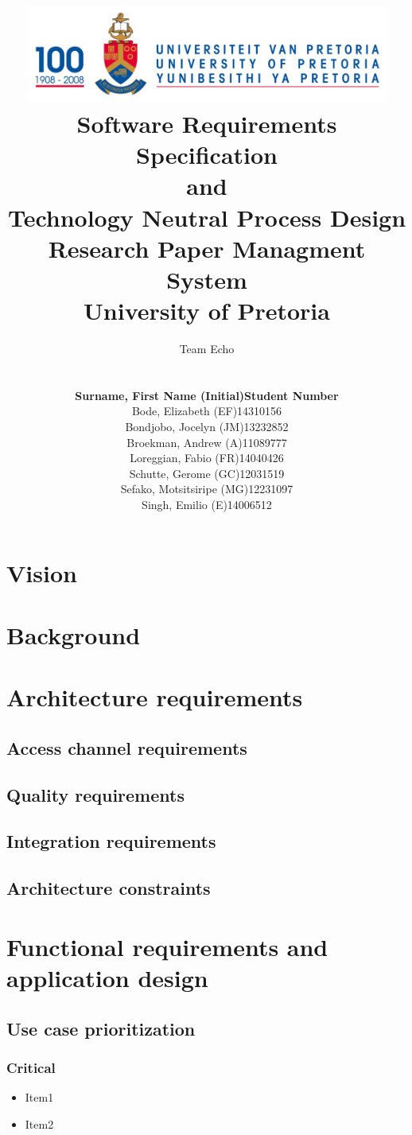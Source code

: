 \documentclass[a4paper,10pt]{article}
\title{\includegraphics[width=12cm]{Eeufeeslogo.jpg} \\
       Software Requirements Specification \\ 
       and \\
       Technology Neutral Process Design \\
       Research Paper Managment System \\
       \vspace{0.5cm}
       University of Pretoria \\
       \vspace{1.0cm}
       }
\date{}
\author{Team Echo\\
	\vspace{0.5cm} \\
	\begin{tabu} to \textwidth { X[l] X[l]}
		\hline
		\textbf{Surname, First Name (Initial)}	& \textbf{Student Number}	\\ \hline \hline
		Bode, Elizabeth (EF)			& 14310156		\\ \hline
		Bondjobo, Jocelyn (JM)		& 13232852		\\ \hline
		Broekman, Andrew (A)		& 11089777		\\ \hline
		Loreggian, Fabio (FR)			& 14040426		\\ \hline
		Schutte, Gerome (GC)		& 12031519		\\ \hline
		Sefako, Motsitsiripe (MG)		& 12231097		\\ \hline
		Singh, Emilio (E)			& 14006512		\\ \hline
		\hline
	\end{tabu}}
\begin{document}
\clearpage
\maketitle
\thispagestyle{empty}

\newpage
{}

\tableofcontents

\newpage
{}

\section{Vision}

\section{Background}

\section{Architecture requirements}
\subsection{Access channel requirements}

\subsection{Quality requirements}

\subsection{Integration requirements}

\subsection{Architecture constraints}

\section{Functional requirements and application design}
\subsection{Use case prioritization}
\subsubsection{Critical}
\begin{itemize}
\item Item1
\item Item2
\end{itemize}
\end{document}
